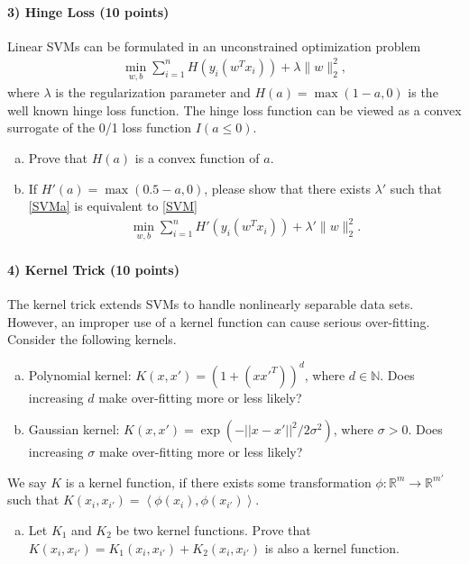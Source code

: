 \documentclass[11pt]{article}
\begin{document}
\paragraph{3) Hinge Loss (10 points)}

Linear SVMs can be formulated in an unconstrained optimization problem
\begin{align}\label{SVM}
\min_{w,b}\sum_{i=1}^n H(y_i(w^Tx_i)) + \lambda\|w\|_2^2,
\end{align}
where $\lambda$ is the regularization parameter and $H(a) = \max(1-a,0)$ is the well known hinge loss function. The hinge loss function can be viewed as a convex surrogate of the 0/1 loss function $I(a \leq 0)$.
\begin{enumerate}[(a)]
\item Prove that $H(a)$ is a convex function of $a$.
\item If $H'(a) = \max(0.5-a,0)$, please show that there exists $\lambda'$ such that \eqref{SVMa} is equivalent to \eqref{SVM}
\begin{align}\label{SVMa}
\min_{w,b}\sum_{i=1}^n H'(y_i(w^Tx_i)) + \lambda'\|w\|_2^2.
\end{align}
\end{enumerate}

\paragraph{4) Kernel Trick (10 points)}
The kernel trick extends SVMs to handle nonlinearly separable data sets. However, an improper use of a kernel function can cause serious over-fitting. Consider the following kernels.
\begin{enumerate}[(a)]
\item Polynomial kernel: $K(x, x') = (1 + (x x'^T))^d$, where  $d\in\mathbb{N}$. Does increasing $d$ make over-fitting more or less likely?
\item Gaussian kernel: $K(x, x') = \exp(-|| x-x'||^2 / 2 \sigma^2)$, where $\sigma>0$. Does increasing $\sigma$ make over-fitting more or less likely?
\end{enumerate}
We say $K$ is a kernel function, if there exists some transformation $\phi:\mathbb{R}^m\rightarrow \mathbb{R}^{m'}$ such that $K(x_i,x_{i'}) = \left<\phi(x_i),\phi(x_{i'})\right>$.
\begin{enumerate}[(c)]
\item Let $K_1$ and $K_2$ be two kernel functions. Prove that $K(x_i,x_{i'}) = K_1(x_i,x_{i'}) + K_2(x_i,x_{i'})$ is also a kernel function.
\end{enumerate}
\end{document}
